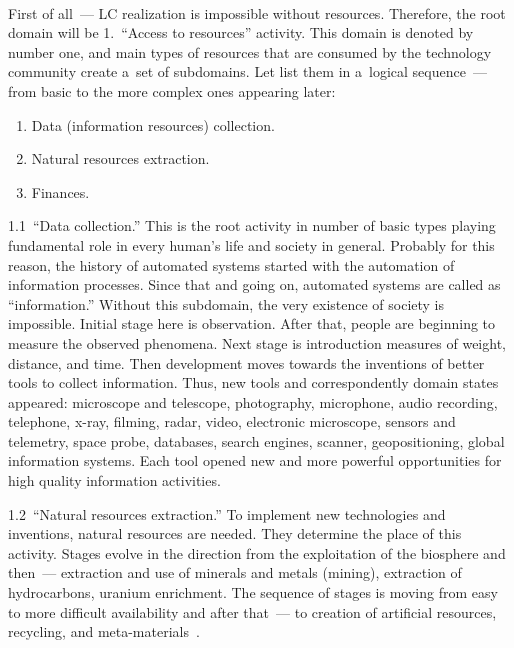 \begin{multicols}{2}
\begin{figure*} %
\vspace*{1pt}
 \begin{center}
 \mbox{%
 \epsfxsize=134.29mm
 }
 \end{center}
 \vspace*{-9pt}
  \end{figure*}

 First of all~--- LC realization is impossible without resources. Therefore,
  the root domain will be
1.~``Access to resources'' activity. This domain is denoted by
number one, and main types of resources that are
consumed by the technology community create a~set of subdomains. Let list them in a~logical
 sequence~--- from basic to the more complex ones appearing later:
 \begin{enumerate}[{1}.1]
 \item Data (information resources) collection.
 \item  Natural resources extraction.
 \item Finances.
 \end{enumerate}

 1.1\ ``Data collection.'' This is the root activity in number of basic types playing fundamental role in every
human's life and society in general. Probably for this reason, the history of automated systems started with
the automation of information processes. Since that and going on,
automated systems are called as
``information.'' Without this subdomain, the very existence of society is impossible. Initial stage here is
observation. After that, people are beginning to measure the observed phenomena. Next stage is
introduction measures of weight, distance, and time. Then development moves towards the inventions of better
tools to collect information. Thus, new tools and correspondently domain states appeared: microscope and
telescope, photography, microphone, audio recording, telephone, x-ray, filming, radar, video, electronic
microscope, sensors and telemetry, space probe, databases, search engines, scanner, geopositioning, global
information systems. Each tool opened new and more powerful opportunities for high quality information
activities.

 1.2\ ``Natural resources extraction.'' To implement new technologies and inventions, natural
resources are needed. They determine the place of this activity. Stages evolve in the direction from the exploitation of
the biosphere and then~--- extraction and use of minerals and metals (mining), extraction of hydrocarbons,
uranium enrichment. The sequence of stages is moving from easy to more difficult availability and after
that~--- to creation of artificial resources, recycling, and meta-materials~\cite{3-sor}.


\end{multicols}
